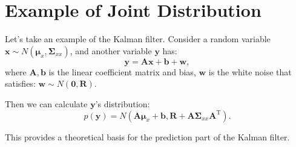 \section{Example of Joint Distribution}
\label{sec:gauss-example}
Let's take an example of the Kalman filter. Consider a random variable $\mathbf{x} \sim N( \boldsymbol{\mu}_x, \boldsymbol{\Sigma}_{xx})$, and another variable $\mathbf{y}$ has:
\begin{equation}
\mathbf{y} = \mathbf{Ax} + \mathbf{b} + \mathbf{w},
\end{equation}
where $\mathbf{A}, \mathbf{b}$ is the linear coefficient matrix and bias, $\mathbf{w}$ is the white noise that satisfies: $\mathbf{w} \sim N(\mathbf{0}, \mathbf{R})$.

Then we can calculate $\mathbf{y}$'s distribution:
\begin{equation}
p\left( \mathbf{y} \right) = N\left( {\mathbf{A}{\boldsymbol{\mu}_x} + \mathbf{b}, \mathbf{R} + \mathbf{A} {\boldsymbol{\Sigma}_{xx}}{\mathbf{A}^\mathrm{T}}} \right).
\end{equation}

This provides a theoretical basis for the prediction part of the Kalman filter.